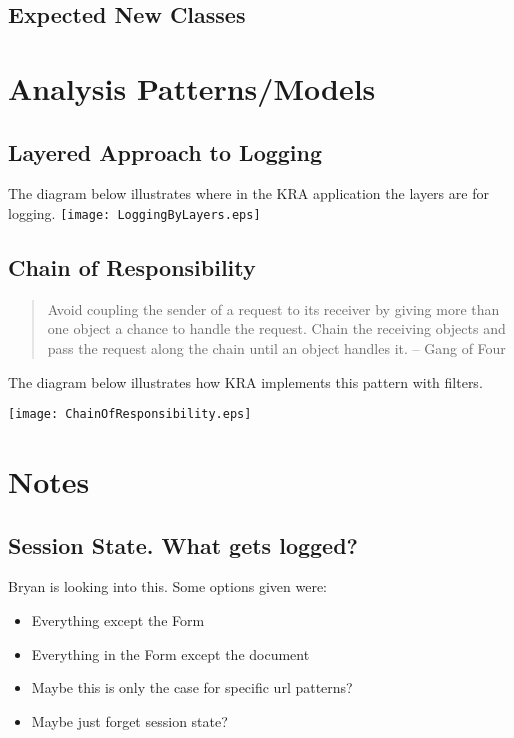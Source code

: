 \documentclass[12pt]{report}
\begin{document}
\subsection{Expected New Classes}

\section{Analysis Patterns/Models}
\subsection{Layered Approach to Logging}
The diagram below illustrates where in the KRA application the layers are for logging.
\texttt{[image: LoggingByLayers.eps]}
\newpage
\subsection{Chain of Responsibility}
\begin{quote}
Avoid coupling the sender of a request to its receiver by giving more than one object a chance to handle
the request. Chain the receiving objects and pass the request along the chain until an object handles it. -- Gang of Four\end{quote}

The diagram below illustrates how KRA implements this pattern with filters.

\texttt{[image: ChainOfResponsibility.eps]}

\section{Notes}
\subsection{Session State. What gets logged?}
Bryan is looking into this. Some options given were:
\begin{itemize}
  \item Everything except the Form 
  \item Everything in the Form except the document
  \item Maybe this is only the case for specific url patterns?
  \item Maybe just forget session state? 
\end{itemize}
\end{document}
